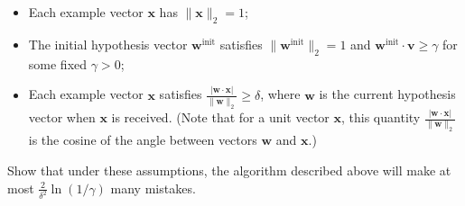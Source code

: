 \documentclass[a4paper]{article}
\theoremstyle{definition}
\renewcommand\vec[1]{\boldsymbol{#1}}
\begin{document}
\begin{enumerate}
\begin{itemize}
\item Each example vector $\vec x$ has $\|\vec x\|_2 = 1$;

\item The initial hypothesis vector $\vec w^{\text{init}}$
satisfies $\|\vec w^{\text{init}}\|_2 = 1$ and
$\vec w^{\text{init}} \cdot \vec v \geq \gamma$
for some fixed $\gamma > 0$;

\item Each example vector $\vec x$ satisfies
$\frac{|\vec w \cdot \vec x|}{\|\vec w\|_2} \geq \delta$,
where $\vec w$ is the current hypothesis vector when $\vec x$ is received.
(Note that for a unit vector $\vec x$, this quantity $\frac{|\vec w \cdot \vec x|}{\|\vec w\|_2}$
is the cosine of the angle between vectors $\vec w$ and $\vec x$.)

\end{itemize}

Show that under these assumptions, the algorithm described above
will make at most $\frac{2}{\delta^2} \ln(1/\gamma)$ many mistakes.
\end{enumerate}
\end{document}
